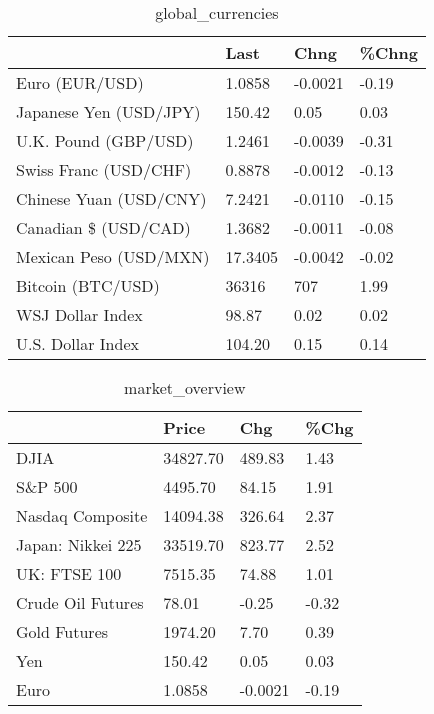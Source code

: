 \documentclass{article}%
\begin{document}
%


\begin{table}[htbp]%
\caption{global\_currencies}%
\centering%
\begin{adjustbox}{width=1\textwidth}%
\begin{tabular}{llll}
\toprule
                       &    Last &    Chng & \%Chng \\
\midrule
        Euro (EUR/USD) &  1.0858 & -0.0021 & -0.19 \\
Japanese Yen (USD/JPY) &  150.42 &    0.05 &  0.03 \\
  U.K. Pound (GBP/USD) &  1.2461 & -0.0039 & -0.31 \\
 Swiss Franc (USD/CHF) &  0.8878 & -0.0012 & -0.13 \\
Chinese Yuan (USD/CNY) &  7.2421 & -0.0110 & -0.15 \\
  Canadian \$ (USD/CAD) &  1.3682 & -0.0011 & -0.08 \\
Mexican Peso (USD/MXN) & 17.3405 & -0.0042 & -0.02 \\
     Bitcoin (BTC/USD) &   36316 &     707 &  1.99 \\
      WSJ Dollar Index &   98.87 &    0.02 &  0.02 \\
     U.S. Dollar Index &  104.20 &    0.15 &  0.14 \\
\bottomrule
\end{tabular}
%
\end{adjustbox}%
\end{table}

%


\begin{table}[htbp]%
\caption{market\_overview}%
\centering%
\begin{adjustbox}{width=1\textwidth}%
\begin{tabular}{llll}
\toprule
                  &    Price &     Chg &  \%Chg \\
\midrule
             DJIA & 34827.70 &  489.83 &  1.43 \\
          S\&P 500 &  4495.70 &   84.15 &  1.91 \\
 Nasdaq Composite & 14094.38 &  326.64 &  2.37 \\
Japan: Nikkei 225 & 33519.70 &  823.77 &  2.52 \\
     UK: FTSE 100 &  7515.35 &   74.88 &  1.01 \\
Crude Oil Futures &    78.01 &   -0.25 & -0.32 \\
     Gold Futures &  1974.20 &    7.70 &  0.39 \\
              Yen &   150.42 &    0.05 &  0.03 \\
             Euro &   1.0858 & -0.0021 & -0.19 \\
\bottomrule
\end{tabular}
%
\end{adjustbox}%
\end{table}

%
\end{document}
